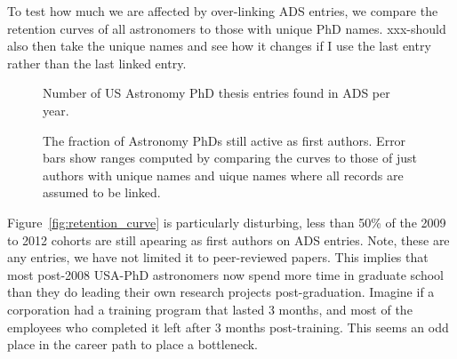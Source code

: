 \documentclass{emulateapj}
\begin{document}
To test how much we are affected by over-linking ADS entries, we compare the retention curves of all astronomers to those with unique PhD names.  xxx-should also then take the unique names and see how it changes if I use the last entry rather than the last linked entry.


\begin{figure}
  \caption{Number of US Astronomy PhD thesis entries found in ADS per year. \label{fig:phdperyear}}
\end{figure}


\begin{figure*}
  \caption{The fraction of Astronomy PhDs still active as first authors.  Error bars show ranges computed by comparing the curves to those of just authors with unique names and uique names where all records are assumed to be linked.   \label{fig:retentiont_curve}}
\end{figure*}







Figure~\ref{fig:retention_curve} is particularly disturbing, less than 50\% of the 2009 to 2012 cohorts are still apearing as first authors on ADS entries. Note, these are any entries, we have not limited it to peer-reviewed papers.  This implies that most post-2008 USA-PhD astronomers now spend more time in graduate school than they do leading their own research projects post-graduation. Imagine if a corporation had a training program that lasted 3 months, and most of the employees who completed it left after 3 months post-training.  This seems an odd place in the career path to place a bottleneck.
\end{document}
